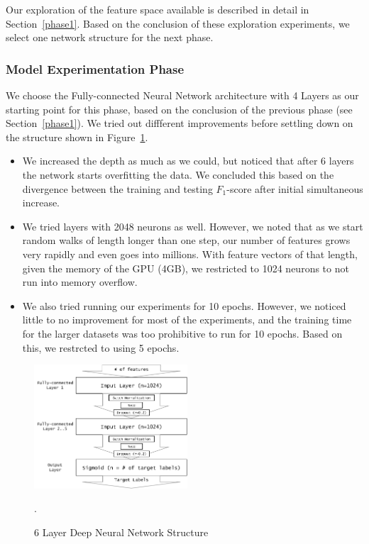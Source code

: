 \documentclass[runningheads,a4paper]{IEEEtran}
\begin{document}
Our exploration of the feature space available is described in detail in Section~\ref{phase1}. Based on the conclusion of these exploration experiments, we select one network structure for the next phase.

\subsubsection{Model Experimentation Phase} 
We choose the Fully-connected Neural Network architecture with 4 Layers as our starting point for this phase, based on the conclusion of the previous phase (see Section~\ref{phase1}). We tried out diffferent improvements before settling down on the structure shown in Figure~\ref{full6}.
\begin{itemize}
\item We increased the depth as much as we could, but noticed that after 6 layers the network starts overfitting the data. We concluded this based on the divergence between the training and testing $F_1$-score after initial simultaneous increase. 
\item We tried layers with 2048 neurons as well. However, we noted that as we start random walks of length longer than one step, our number of features grows very rapidly and even goes into millions. With feature vectors of that length, given the memory of the GPU (4GB), we restricted to 1024 neurons to not run into memory overflow.
\item We also tried running our experiments for 10 epochs. However, we noticed little to no improvement for most of the experiments, and the training time for the larger datasets was too prohibitive to run for 10 epochs. Based on this, we restrcted to using 5 epochs. 
\end{itemize}

\begin{figure}[h]
\centering
\includegraphics[width=2.25in]{figures/full6.pdf}
\caption{6 Layer Deep Neural Network Structure}
\label{full6}.
\end{figure}
\end{document}
